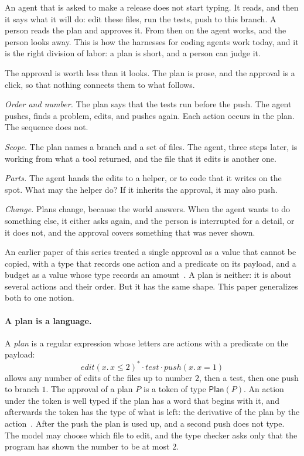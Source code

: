 \documentclass[acmsmall,nonacm,screen]{acmart}
\newcommand{\kw}[1]{\mathsf{#1}}
\newcommand{\nm}[1]{\mathit{#1}}
\newcommand{\Plan}[1]{\kw{Plan}(#1)}
\newcommand{\edit}{\nm{edit}}
\newcommand{\test}{\nm{test}}
\newcommand{\push}{\nm{push}}
\begin{document}
An agent that is asked to make a release does not start typing. It reads, and then it says
what it will do: edit these files, run the tests, push to this branch. A person reads the
plan and approves it. From then on the agent works, and the person looks away. This is how
the harnesses for coding agents work today, and it is the right division of labor: a plan is
short, and a person can judge it.

The approval is worth less than it looks. The plan is prose, and the approval is a click, so
that nothing connects them to what follows.

\emph{Order and number.} The plan says that the tests run before the push. The agent pushes,
finds a problem, edits, and pushes again. Each action occurs in the plan. The sequence does
not.

\emph{Scope.} The plan names a branch and a set of files. The agent, three steps later, is
working from what a tool returned, and the file that it edits is another one.

\emph{Parts.} The agent hands the edits to a helper, or to code that it writes on the spot.
What may the helper do? If it inherits the approval, it may also push.

\emph{Change.} Plans change, because the world answers. When the agent wants to do something
else, it either asks again, and the person is interrupted for a detail, or it does not, and
the approval covers something that was never shown.

An earlier paper of this series treated a single approval as a value that cannot be
copied, with a type that records one action and a predicate on its payload, and a budget as
a value whose type records an amount~\citep{tpp4}. A plan is neither: it is about several
actions and their order. But it has the same shape. This paper generalizes both to one
notion.

\paragraph{A plan is a language.} A \emph{plan} is a regular expression whose letters are
actions with a predicate on the payload:
\[
\edit(x.\,x \le 2)^{*} \cdot \test \cdot \push(x.\,x = 1)
\]
allows any number of edits of the files up to number $2$, then a test, then one push to
branch $1$. The approval of a plan $P$ is a token of type $\Plan{P}$. An action under the
token is well typed if the plan has a word that begins with it, and afterwards the token has
the type of what is left: the derivative of the plan by the action~\citep{brzozowski1964}.
After the push the plan is used up, and a second push does not type. The model may choose
which file to edit, and the type checker asks only that the program has shown the number to
be at most $2$.
\end{document}
